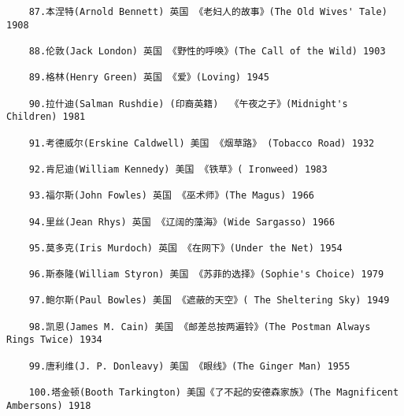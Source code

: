 \documentclass[UTF8]{../RepresentationUniverse}
\begin{document}
\begin{lstlisting}
    87.本涅特(Arnold Bennett) 英国 《老妇人的故事》(The Old Wives' Tale) 1908
    
    88.伦敦(Jack London) 英国 《野性的呼唤》(The Call of the Wild) 1903
    
    89.格林(Henry Green) 英国 《爱》(Loving) 1945
    
    90.拉什迪(Salman Rushdie) (印裔英籍)  《午夜之子》(Midnight's Children) 1981
    
    91.考德威尔(Erskine Caldwell) 美国 《烟草路》 (Tobacco Road) 1932
    
    92.肯尼迪(William Kennedy) 美国 《铁草》( Ironweed) 1983
    
    93.福尔斯(John Fowles) 英国 《巫术师》(The Magus) 1966
    
    94.里丝(Jean Rhys) 英国 《辽阔的藻海》(Wide Sargasso) 1966
    
    95.莫多克(Iris Murdoch) 英国 《在网下》(Under the Net) 1954
    
    96.斯泰隆(William Styron) 美国 《苏菲的选择》(Sophie's Choice) 1979
    
    97.鲍尔斯(Paul Bowles) 美国 《遮蔽的天空》( The Sheltering Sky) 1949
    
    98.凯恩(James M. Cain) 美国 《邮差总按两遍铃》(The Postman Always Rings Twice) 1934
    
    99.唐利维(J. P. Donleavy) 美国 《眼线》(The Ginger Man) 1955
    
    100.塔金顿(Booth Tarkington) 美国《了不起的安德森家族》(The Magnificent Ambersons) 1918
\end{lstlisting}
\end{document}
